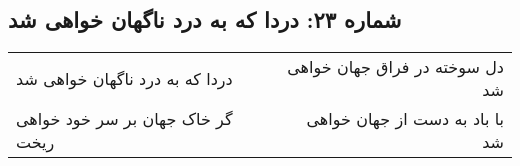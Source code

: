 \begin{center}
\section*{شماره ۲۳: دردا که به درد ناگهان خواهی شد}
\label{sec:023}
\begin{longtable}{l p{0.5cm} r}
دردا که به درد ناگهان خواهی شد
&&
دل سوخته در فراق جهان خواهی شد
\\
گر خاک جهان بر سر خود خواهی ریخت
&&
با باد به دست از جهان خواهی شد
\\
\end{longtable}
\end{center}
